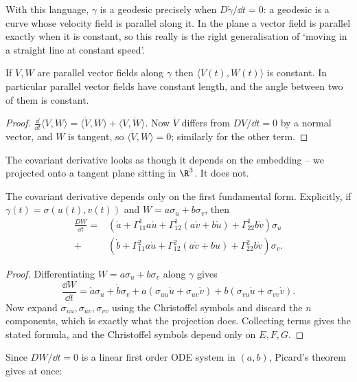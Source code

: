 With this language, $\gamma$ is a geodesic precisely when $D\dot\gamma/\dd t = 0$: a geodesic is a curve whose velocity field is parallel along it. In the plane a vector field is parallel exactly when it is constant, so this really is the right generalisation of `moving in a straight line at constant speed'.

\begin{proposition}
    If $V, W$ are parallel vector fields along $\gamma$ then $\langle V(t), W(t)\rangle$ is constant. In particular parallel vector fields have constant length, and the angle between two of them is constant.
\end{proposition}
\begin{proof}
    $\frac{\dd}{\dd t}\langle V, W\rangle = \langle \dot V, W\rangle + \langle V, \dot W\rangle$. Now $\dot V$ differs from $DV/\dd t = 0$ by a normal vector, and $W$ is tangent, so $\langle \dot V, W\rangle = 0$; similarly for the other term.
\end{proof}

The covariant derivative looks as though it depends on the embedding -- we projected onto a tangent plane sitting in $\R^3$. It does not.

\begin{lemma}
    The covariant derivative depends only on the first fundamental form. Explicitly, if $\gamma(t) = \sigma(u(t),v(t))$ and $W = a\sigma_u + b\sigma_v$, then
    \begin{align*}
        \frac{DW}{\dd t} = &\left(\dot a + \Gamma^1_{11}a\dot u + \Gamma^1_{12}(a \dot v + b\dot u) + \Gamma^1_{22}b\dot v\right)\sigma_u \\
        + &\left(\dot b + \Gamma^2_{11}a\dot u + \Gamma^2_{12}(a\dot v + b \dot u) + \Gamma^2_{22}b\dot v\right)\sigma_v.
    \end{align*}
\end{lemma}
\begin{proof}
    Differentiating $W = a\sigma_u + b\sigma_v$ along $\gamma$ gives
    $$
    \frac{\dd W}{\dd t} = \dot a \sigma_u + \dot b \sigma_v + a\left(\sigma_{uu}\dot u + \sigma_{uv}\dot v\right) + b \left(\sigma_{vu}\dot u + \sigma_{vv}\dot v\right).
    $$
    Now expand $\sigma_{uu}, \sigma_{uv}, \sigma_{vv}$ using the Christoffel symbols and discard the $n$ components, which is exactly what the projection does. Collecting terms gives the stated formula, and the Christoffel symbols depend only on $E, F, G$.
\end{proof}

Since $DW/\dd t = 0$ is a linear first order ODE system in $(a, b)$, Picard's theorem gives at once:


